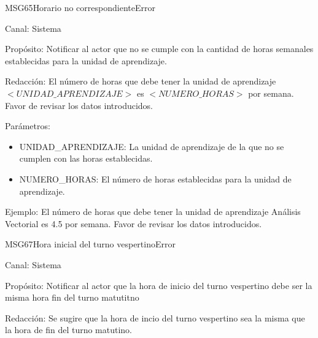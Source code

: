 \begin{mensaje}{MSG65}{Horario no correspondiente}{Error}
	\item[Canal:] Sistema
	\item[Propósito:] Notificar al actor que no se cumple con la cantidad de horas semanales establecidas para la unidad de aprendizaje.
	\item[Redacción:] El número de horas que debe tener la unidad de aprendizaje $<UNIDAD\_APRENDIZAJE>$ es $<NUMERO\_HORAS>$ por semana. Favor de revisar los datos introducidos.
	\item[Parámetros:] \cdtEmpty
	\begin{itemize}
		\item UNIDAD\_APRENDIZAJE: La unidad de aprendizaje de la que no se cumplen con las horas establecidas.
		\item NUMERO\_HORAS: El número de horas establecidas para la unidad de aprendizaje.
	\end{itemize}
	\item[Ejemplo:] El número de horas que debe tener la unidad de aprendizaje Análisis Vectorial es 4.5 por semana. Favor de revisar los datos introducidos.
\end{mensaje}



\begin{mensaje}{MSG67}{Hora inicial del turno vespertino}{Error}
	\item[Canal:] Sistema
	\item[Propósito:] Notificar al actor que la hora de inicio del turno vespertino debe ser la misma hora fin del turno matutitno
	\item[Redacción:] Se sugire que la hora de incio del turno vespertino sea la misma que la hora de fin del turno matutino.
\end{mensaje}

